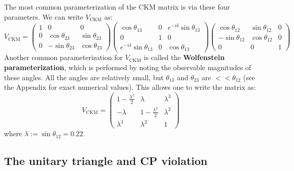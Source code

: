 \documentclass[11pt, oneside]{article}   	%
\theoremstyle{definition}
\numberwithin{equation}{subsection}		%
\begin{document}
The most common parameterization of the CKM matrix is via these four parameters. We can write $V_\mathrm{CKM}$ as:
\begin{equation}
	V_\mathrm{CKM} = \begin{pmatrix} 
		1 & 0 & 0 \\ 0 & \cos\theta_{23} & \sin\theta_{23} \\ 0 & -\sin\theta_{23} & \cos\theta_{23} 
	\end{pmatrix}
	\begin{pmatrix} 
		\cos\theta_{13} & 0 & e^{-i\delta} \sin\theta_{13} \\ 0 & 1 & 0 \\ e^{-i\delta} \sin\theta_{13} & 0 & \cos\theta_{13} 
	\end{pmatrix}
	\begin{pmatrix}
		\cos\theta_{12} & \sin\theta_{12} & 0 \\ -\sin\theta_{12} & \cos\theta_{12} & 0 \\ 0 & 0 & 1 
	\end{pmatrix}
\end{equation}
Another common parameterization for $V_\mathrm{CKM}$ is called the \textbf{Wolfenstein parameterization}, which is performed by noting 
the observable magnitudes of these angles. All the angles are relatively small, but $\theta_{13}$ and $\theta_{23}$ are $<< \theta_{12}$ 
(see the Appendix for exact numerical values). This allows one to write the matrix as:
\begin{equation}
	V_\mathrm{CKM} = \begin{pmatrix} 1 - \frac{\lambda^2}{2} & \lambda & \lambda^3 \\
	-\lambda & 1 - \frac{\lambda^2}{2} & \lambda^2 \\
	\lambda^3 & \lambda^2 & 1
	\end{pmatrix}
	\label{eq:wolfenstein}
\end{equation}
where $\lambda := \sin\theta_{12} = 0.22$.

\subsection{The unitary triangle and CP violation}
\end{document}
